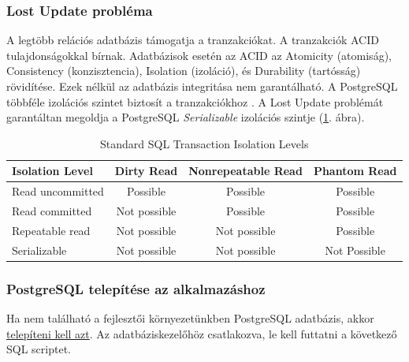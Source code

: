 \subsubsection{Lost Update probléma}
A legtöbb relációs adatbázis támogatja a tranzakciókat. A tranzakciók ACID tulajdonságokkal bírnak.
Adatbázisok esetén az ACID az Atomicity (atomiság), Consistency (konzisztencia), Isolation (izoláció), és Durability (tartósság) rövidítése. Ezek nélkül az adatbázis integritása nem garantálható.
A PostgreSQL többféle izolációs szintet biztosít a tranzakciókhoz \cite{postgresql}.
A Lost Update problémát garantáltan megoldja a PostgreSQL \textit{Serializable} izolációs szintje (\ref{isolation-levels}. ábra).
\begin{table}[h]
    \label{isolation-levels}
    \centering
    \caption{ Standard SQL Transaction Isolation Levels}
    \begin{tabular}{l|c|c|c|}
Isolation Level & Dirty Read  & Nonrepeatable Read & Phantom Read\\
        \hline
Read uncommitted  & Possible & Possible & Possible \\
\hline
Read committed & Not possible & Possible & Possible \\
\hline
Repeatable read & Not possible & Not possible & Possible \\
\hline
Serializable & Not possible & Not possible & Not Possible \\
        \hline
    \end{tabular}
\end{table}

\subsubsection{PostgreSQL telepítése az alkalmazáshoz}\label{subsubsec:postgresql-telepítése-a-programhoz}

Ha nem található a fejlesztői környezetünkben PostgreSQL adatbázis, akkor \href{https://www.postgresql.org/download/}{telepíteni kell azt}.
Az adatbáziskezelőhöz csatlakozva, le kell futtatni a következő SQL scriptet.

